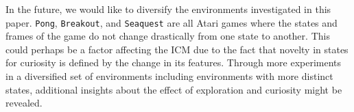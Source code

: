 \documentclass{article}
\begin{document}
In the future, we would like to diversify the environments investigated in this paper. \texttt{Pong}, \texttt{Breakout}, and \texttt{Seaquest} are all Atari games where the states and frames of the game do not change drastically from one state to another. This could perhaps be a factor affecting the ICM due to the fact that novelty in states for curiosity is defined by the change in its features. Through more experiments in a diversified set of environments including environments with more distinct states, additional insights about the effect of exploration and curiosity might be revealed.



\end{document}

